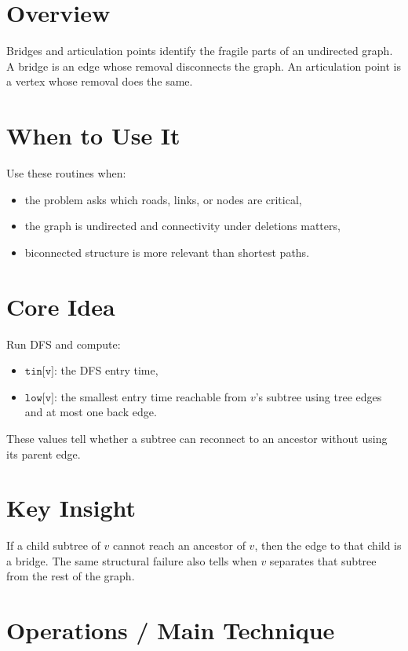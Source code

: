 \section*{Overview}

Bridges and articulation points identify the fragile parts of an undirected graph. A bridge is an edge whose removal
disconnects the graph. An articulation point is a vertex whose removal does the same.

\section*{When to Use It}

Use these routines when:

\begin{itemize}
  \item the problem asks which roads, links, or nodes are critical,
  \item the graph is undirected and connectivity under deletions matters,
  \item biconnected structure is more relevant than shortest paths.
\end{itemize}

\section*{Core Idea}

Run DFS and compute:

\begin{itemize}
  \item \(\texttt{tin[v]}\): the DFS entry time,
  \item \(\texttt{low[v]}\): the smallest entry time reachable from \(v\)'s subtree using tree edges and at most one back edge.
\end{itemize}

These values tell whether a subtree can reconnect to an ancestor without using its parent edge.

\section*{Key Insight}

If a child subtree of \(v\) cannot reach an ancestor of \(v\), then the edge to that child is a bridge. The same
structural failure also tells when \(v\) separates that subtree from the rest of the graph.

\section*{Operations / Main Technique}

